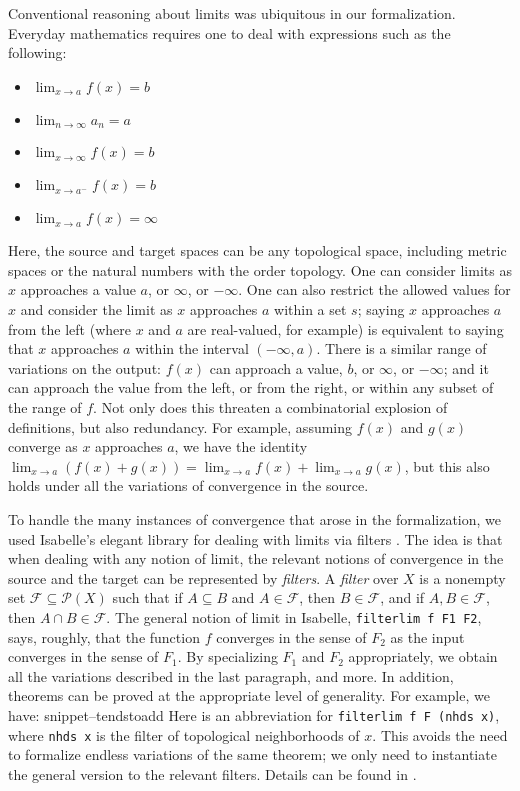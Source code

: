 \documentclass{svjour3}
\newcommand{\Snippet}[1]{\csname snippet--#1\endcsname}
\begin{document}
Conventional reasoning about limits was ubiquitous in our formalization. Everyday mathematics requires one to deal with expressions such as the following:
\begin{itemize}
 \item $\lim_{x \to a} f(x) = b$
 \item $\lim_{n \to \infty} a_n = a$
 \item $\lim_{x \to \infty} f(x) = b$
 \item $\lim_{x \to a^-} f(x) = b$
 \item $\lim_{x \to a} f(x) = \infty$
\end{itemize}
Here, the source and target spaces can be any topological space, including metric spaces or the natural numbers with the order topology. One can consider limits as $x$ approaches a value $a$, or $\infty$, or $-\infty$. One can also restrict the allowed values for $x$ and consider the limit as $x$ approaches $a$ within a set $s$; saying $x$ approaches $a$ from the left (where $x$ and $a$ are real-valued, for example) is equivalent to saying that $x$ approaches $a$ within the interval $(-\infty, a)$. There is a similar range of variations on the output: $f(x)$ can approach a value, $b$, or $\infty$, or $-\infty$; and it can approach the value from the left, or from the right, or within any subset of the range of $f$. Not only does this threaten a combinatorial explosion of definitions, but also redundancy. For example, assuming $f(x)$ and $g(x)$ converge as $x$ approaches $a$, we have the identity $\lim_{x \to a} (f(x) + g(x)) = \lim_{x \to a} f(x) + \lim_{x \to a} g(x)$, but this also holds under all the variations of convergence in the source.

To handle the many instances of convergence that arose in the formalization, we used Isabelle's elegant library for dealing with limits via filters \cite{hoelzl:et:al:13}. The idea is that when dealing with any notion of limit, the relevant notions of convergence in the source and the target can be represented by \emph{filters}. A {\em filter} over $X$ is a nonempty set $\mathcal F \subseteq \mathcal P(X)$ such that if $A \subseteq B$ and $A \in \mathcal F$, then $B \in \mathcal F$, and if $A, B \in \mathcal F$, then $A \cap B \in \mathcal F$. The general notion of limit in Isabelle, {\tt filterlim f F1 F2}, says, roughly, that the function $f$ converges in the sense of $F_2$ as the input converges in the sense of $F_1$. By specializing $F_1$ and $F_2$ appropriately, we obtain all the variations described in the last paragraph, and more. In addition, theorems can be proved at the appropriate level of generality. For example, we have:
\Snippet{tendstoadd}
Here  is an abbreviation for {\tt filterlim f F (nhds x)}, where {\tt nhds x} is the filter of topological neighborhoods of $x$. This avoids the need to formalize endless variations of the same theorem; we only need to instantiate the general version to the relevant filters. Details can be found in \cite{hoelzl:et:al:13}.
\end{document}
